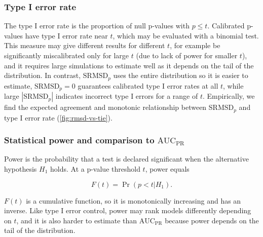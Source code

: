 \documentclass[11pt]{article}
\newcommand{\rmsd}{\text{SRMSD}_p}
\newcommand{\auc}{\text{AUC}_\text{PR}}
\begin{document}
\begin{linenumbers}
\subsubsection{Type I error rate}

The type I error rate is the proportion of null p-values with $p \le t$.
Calibrated p-values have type I error rate near $t$, which may be evaluated with a binomial test.
This measure may give different results for different $t$, for example be significantly miscalibrated only for large $t$ (due to lack of power for smaller $t$), and it requires large simulations to estimate well as it depends on the tail of the distribution.
In contrast, $\rmsd$ uses the entire distribution so it is easier to estimate, $\rmsd = 0$ guarantees calibrated type I error rates at all $t$, while large $|\rmsd|$ indicates incorrect type I errors for a range of $t$.
Empirically, we find the expected agreement and monotonic relationship between $\rmsd$ and type I error rate (\cref{fig:rmsd-vs-tie}).

\subsubsection{Statistical power and comparison to $\auc$}

Power is the probability that a test is declared significant when the alternative hypothesis $H_1$ holds.
At a p-value threshold $t$, power equals
\begin{linenomath*}
$$
F(t) = \Pr( p < t | H_1 ).
$$
\end{linenomath*}
$F(t)$ is a cumulative function, so it is monotonically increasing and has an inverse.
Like type I error control, power may rank models differently depending on $t$, and it is also harder to estimate than $\auc$ because power depends on the tail of the distribution.


\end{linenumbers}
\end{document}
